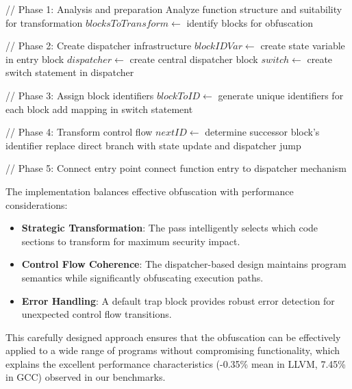 \documentclass[conference]{IEEEtran}
\begin{document}
\begin{algorithm}[H]
\caption{Control Flow Taint Implementation}
\begin{algorithmic}[1]
    \State // Phase 1: Analysis and preparation
    \State Analyze function structure and suitability for transformation
    \State $blocksToTransform \gets$ identify blocks for obfuscation
    
    \State // Phase 2: Create dispatcher infrastructure
    \State $blockIDVar \gets$ create state variable in entry block
    \State $dispatcher \gets$ create central dispatcher block
    \State $switch \gets$ create switch statement in dispatcher
    
    \State // Phase 3: Assign block identifiers
    \State $blockToID \gets$ generate unique identifiers for each block
        \State add mapping in switch statement
    \EndFor
    
    \State // Phase 4: Transform control flow
        \State $nextID \gets$ determine successor block's identifier
        \State replace direct branch with state update and dispatcher jump
    \EndFor
    
    \State // Phase 5: Connect entry point
    \State connect function entry to dispatcher mechanism
\EndProcedure
\end{algorithmic}
\end{algorithm}

The implementation balances effective obfuscation with performance considerations:

\begin{itemize}
    \item \textbf{Strategic Transformation}: The pass intelligently selects which code sections to transform for maximum security impact.
    
    \item \textbf{Control Flow Coherence}: The dispatcher-based design maintains program semantics while significantly obfuscating execution paths.
    
    \item \textbf{Error Handling}: A default trap block provides robust error detection for unexpected control flow transitions.
\end{itemize}

This carefully designed approach ensures that the obfuscation can be effectively applied to a wide range of programs without compromising functionality, which explains the excellent performance characteristics (-0.35\% mean in LLVM, 7.45\% in GCC) observed in our benchmarks.
\end{document}
